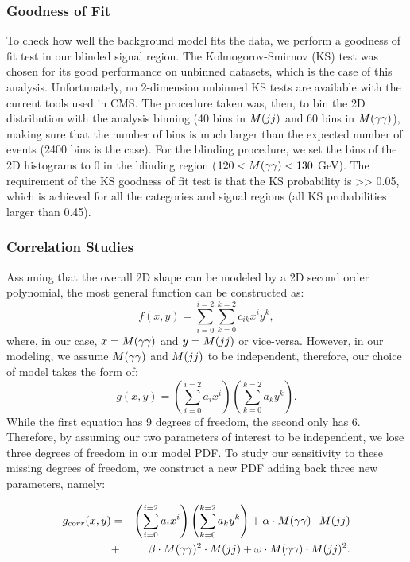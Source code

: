 \subsubsection{Goodness of Fit}

To check how well the background model fits the data, we perform a goodness of fit test in our blinded signal region.
The Kolmogorov-Smirnov (KS) test was chosen for its good performance on unbinned datasets, which is the case of this analysis.
Unfortunately, no 2-dimension unbinned KS tests are available with the current tools used in CMS.
The procedure taken was, then, to bin the 2D distribution with the analysis binning (40 bins in $M(jj)$ and 60 bins in $M(\gamma\gamma)$), making sure that the number of bins is much larger than the expected number of events (2400 bins is the case).
For the blinding procedure, we set the bins of the 2D histograms to 0 in the blinding region ($120 < M(\gamma\gamma) < 130$ GeV).
The requirement of the KS goodness of fit test is that the KS probability is >> 0.05, which is achieved for all the categories and signal regions (all KS probabilities larger than 0.45).

\subsubsection{Correlation Studies}

Assuming that the overall 2D shape can be modeled by a 2D second order polynomial, the most general function can be constructed as:
\begin{equation}
f(x,y) = \sum_{i=0}^{i=2}\sum_{k=0}^{k=2}c_{ik}x^{i}y^{k},
\end{equation}
where, in our case, $x = M(\gamma\gamma)$ and $y = M(jj)$ or vice-versa. 
However, in our modeling, we assume $M(\gamma\gamma)$ and $M(jj)$ to be independent, therefore, our choice of model takes the form of:
\begin{equation}
g(x,y) = \left( \sum_{i=0}^{i=2} a_{i} x^{i}\right)\left( \sum_{k=0}^{k=2} a_{k} y^{k} \right).
\end{equation}
While the first equation has 9 degrees of freedom, the second only has 6. 
Therefore, by assuming our two parameters of interest to be independent, we lose three degrees of freedom in our model PDF. 
To study our sensitivity to these missing degrees of freedom, we construct a new PDF adding back three new parameters, namely:

\begin{eqnarray}
g_{corr}(x,y) &=& \left( \sum_{i=0}^{i=2} a_{i} x^{i}\right)\left( \sum_{k=0}^{k=2} a_{k} y^{k} \right) + \alpha\cdot M(\gamma\gamma)\cdot M(jj) \\
&+& \beta\cdot M(\gamma\gamma)^{2}\cdot M(jj)+ \omega\cdot M(\gamma\gamma)\cdot M(jj)^{2}.
\end{eqnarray}

